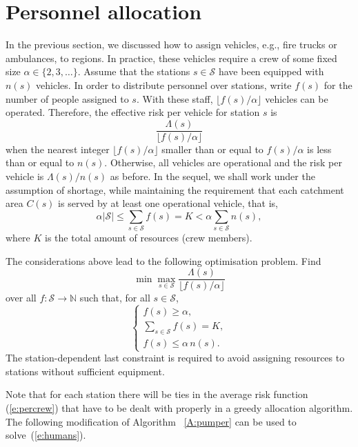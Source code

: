 \documentclass[twoside,11pt]{article}
\begin{document}
\section{Personnel allocation}
\label{S:crew}

In the previous section, we discussed how to assign vehicles, 
e.g., fire trucks or ambulances, to regions. In practice, these vehicles 
require a crew of some fixed size  $\alpha  \in \{ 2, 3, \dots \}$. 
Assume that the stations $s \in \mathcal{S}$ have been equipped with 
$n(s)$ vehicles. In order to distribute personnel over stations,
write $f(s)$ for the number of people assigned to $s$. With these
staff, $\lfloor f(s)/\alpha \rfloor$ vehicles can be operated. 
Therefore, the effective risk per vehicle for station $s$ is 
\begin{equation}
\frac{\Lambda(s)}  { \lfloor f(s)/\alpha \rfloor }
\label{e:percrew}
\end{equation}
when the nearest integer $ \lfloor f(s)/\alpha \rfloor$ smaller 
than or equal to $f(s)/\alpha$ is less than or equal to $n(s)$. 
Otherwise, all vehicles are operational and the risk per vehicle 
is  ${\Lambda(s)} / n(s) $ as before. In the sequel, we shall work 
under the assumption of shortage, while maintaining the requirement 
that each catchment area $C(s)$ is served by at least one operational 
vehicle, that is, 
\[
 \alpha |\mathcal{S}| \leq \sum_{s\in \mathcal{S}} f(s) 
 = K < \alpha \sum_{s\in \mathcal{S}} n(s),
\]
where $K$ is the total amount of resources (crew members).

The considerations above lead to the following optimisation problem.
Find
\begin{equation}
\min\max_{s \in \mathcal{S}} \frac{\Lambda(s)}
{ \lfloor f(s)/\alpha \rfloor}
\label{e:humans}
\end{equation}
over all $f: \mathcal{S} \to \mathbb{N}$ such that, for all
$s \in \mathcal{S}$,
\[ 
\left\{ \begin{array}{l}
f(s) \geq \alpha,\\
\sum_{s\in\mathcal{S}} f(s) = K ,\\
f(s) \leq \alpha \, n(s).
\end{array} \right.
\]
The station-dependent last constraint is required to avoid 
assigning resources to stations without sufficient equipment.

Note that for each station there will be ties in the average risk 
function (\ref{e:percrew}) that have to be dealt with 
properly in a greedy allocation algorithm. The following modification of
Algorithm ~\ref{A:pumper} can be used to solve~(\ref{e:humans}).
\end{document}

